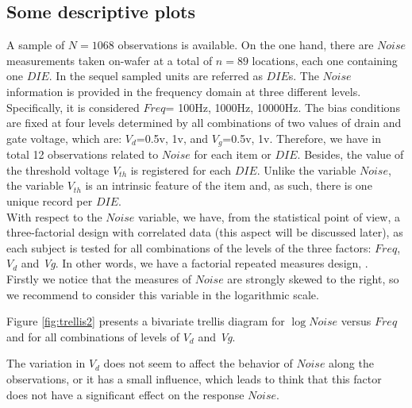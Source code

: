 \documentclass[sn-mathphys]{sn-jnl}%
\theoremstyle{thmstyleone}%
\theoremstyle{thmstyletwo}%
\theoremstyle{thmstylethree}%
\begin{document}
\subsection{Some descriptive plots}
A sample of $N = 1068$ observations is available. On the one hand, there are $Noise$ measurements taken on-wafer at a total of $n=89$ locations, each one containing one  $DIE$. In the sequel sampled units are referred as $DIE$s. The $Noise$ information is provided in the frequency domain at three different levels. Specifically, it is considered $Freq$= 100Hz, 1000Hz, 10000Hz. The bias conditions are fixed at four levels determined by all combinations of two values of drain and gate voltage, which are: $V_d$=0.5v, 1v, and $V_g$=0.5v, 1v. Therefore, we have in total 12 observations related to $Noise$ for each item or $DIE$. Besides, the value of  the threshold voltage $V_{th}$ is registered for each $DIE$. Unlike the variable $Noise$, the variable $V_{th}$ is an intrinsic feature of the item and, as such, there is one unique record per $DIE$.\\

With respect to the $Noise$ variable, we have, from the statistical point of view, a three-factorial design with correlated data (this aspect will be discussed later), as each subject is tested for all combinations of the levels of the three factors: $Freq$, $V_d$ and {\it Vg}. In other words, we have a factorial repeated measures design, \cite{BHN2000}.\\

Firstly we notice that the measures of  $Noise$ are strongly skewed to the right, so we recommend to consider this variable in the logarithmic scale.

Figure \ref{fig:trellis2} presents a bivariate trellis diagram for $\log Noise$ versus $Freq$ and for all combinations of levels of $V_d$ and {\it Vg}.

The variation in $V_d$ does not seem to affect the behavior of $Noise$ along the observations, or it has a small influence, which leads to think that this factor does not have a significant effect on the response $Noise$.  
\end{document}
